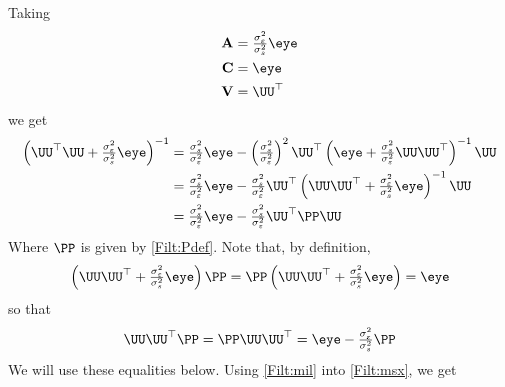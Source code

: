 Taking 
\begin{align}
{\bf A} &= \tfrac{\sigma_\varepsilon^2}{\sigma_s^2} \eye  \\
{\bf C} &= \eye      \\
{\bf V} &= \UU^\top
\end{align}
we get
\begin{align}
\label{Filt:mil}
\left(\UU^\top \UU + \tfrac{\sigma_\varepsilon^2}{\sigma_s^2}\eye \right)^{-1} 
    &= \tfrac{\sigma_s^2}{\sigma_\varepsilon^2}\eye 
	 - \left(\tfrac{\sigma_s^2}{\sigma_\varepsilon^2}\right)^2 \UU^\top 
	   \left(\eye + \tfrac{\sigma_s^2}{\sigma_\varepsilon^2} \UU \UU^\top \right)^{-1} 
	   \UU     \nonumber \\
    &= \tfrac{\sigma_s^2}{\sigma_\varepsilon^2}\eye 
	 - \tfrac{\sigma_s^2}{\sigma_\varepsilon^2} \UU^\top 
	   \left(\UU \UU^\top + \tfrac{\sigma_\varepsilon^2}{\sigma_s^2} \eye \right)^{-1} 
	   \UU   \nonumber\\
    &= \tfrac{\sigma_s^2}{\sigma_\varepsilon^2}\eye 
	 - \tfrac{\sigma_s^2}{\sigma_\varepsilon^2} \UU^\top 
	   \PP \UU
\end{align}
Where $\PP$ is given by \eqref{Filt:Pdef}. Note that, by definition,
\begin{align}
\left(\UU \UU^\top + \tfrac{\sigma_\varepsilon^2}{\sigma_s^2} \eye \right) \PP 
= \PP\left(\UU \UU^\top + \tfrac{\sigma_\varepsilon^2}{\sigma_s^2} \eye \right)  
= \eye 
\end{align}
so that
\begin{align}
\UU \UU^\top \PP = \PP \UU \UU^\top  = \eye - \tfrac{\sigma_\varepsilon^2}{\sigma_s^2} \PP
\end{align}
We will use these equalities below. Using \eqref{Filt:mil} into \eqref{Filt:msx}, we get
